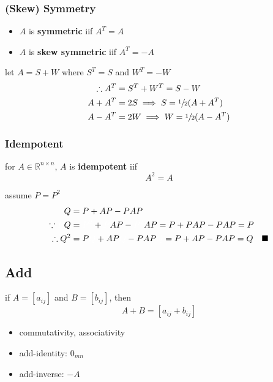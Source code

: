 		\subsubsection{(Skew) Symmetry}
			\begin{definition}
				\begin{itemize}
					\item $A$ is \textbf{symmetric} iif $A^T=A$
					\item $A$ is \textbf{skew symmetric} iif $A^T=-A$
				\end{itemize}
			\end{definition}
			\begin{example}[Prove $\forall A\in\mathbb{R}^{n\times n}\exists$ symmetric $S$ and skew symmetric $W$ st $A=S+W$ and are uniquely determined by $A$]
				let $A=S+W$ where $S^T=S$ and $W^T=-W$
				\begin{align*}
					\therefore A^T&=S^T+W^T=S-W\\
					A+A^T&=2S\implies S=\sfrac12(A+A^T)\\
					A-A^T&=2W\implies W=\sfrac12(A-A^T)
				\end{align*}
			\end{example}
		\subsubsection{Idempotent}
		    \begin{definition}
		    	for $A\in\mathbb{R}^{n\times n}$, $A$ is \textbf{idempotent} iif
				$$A^2=A$$
		    \end{definition}
			\begin{example}[Prove $\forall A\in\mathbb{R}^{n\times n}$\\$P$ is idempotent $\implies Q=P+AP-PAP$ is idempotent]
				assume $P=P^2$
				\begin{align*}
					Q&=P+AP-PAP\\
					\because\textcolor{\colo}PQ&=\textcolor{\colo}{P^2}+\textcolor{\colo}PAP-\textcolor{\colo}{P^2}AP=P+PAP-PAP=P\\
					\therefore Q^2&=P\textcolor{\colo}Q+AP\textcolor{\colo}Q-PAP\textcolor{\colo}Q=P+AP-PAP=Q\quad\blacksquare
				\end{align*}
			\end{example}
	\subsection{Add}
		\begin{definition}[\texttt{[m,n] * [m,n] -> [m,n]}]
			if $A=[a_{ij}]$ and $B=[b_{ij}]$, then
			$$A+B=[a_{ij}+b_{ij}]$$
			\begin{itemize}
				\item commutativity, associativity
				\item add-identity: $0_{mn}$
				\item add-inverse: $-A$
			\end{itemize}
		\end{definition}
